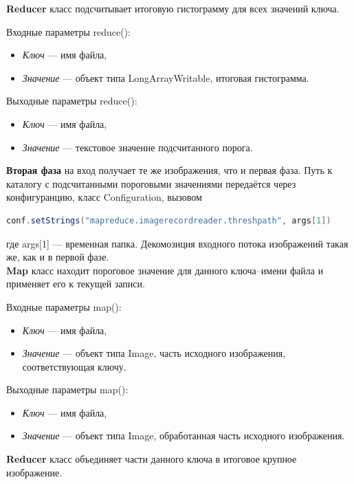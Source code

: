 \documentclass[12pt,a4paper]{extarticle} %
\begin{document}
    \noindent \textbf{Reducer} класс подсчитывает итоговую гистограмму для всех значений ключа. 

    \noindent Входные параметры reduce():
    \begin{itemize}
        \item[] \textit{Ключ} --- имя файла,
        \item[] \textit{Значение} --- объект типа LongArrayWritable, итоговая гистограмма.
    \end{itemize}

    \noindent Выходные параметры reduce():
    \begin{itemize}
        \item[] \textit{Ключ} --- имя файла,
        \item[] \textit{Значение} --- текстовое значение подсчитанного порога.
    \end{itemize}

 \textbf{Вторая фаза} на вход получает те же изображения, что и первая фаза. Путь к каталогу с подсчитанными пороговыми значениями передаётся через конфигуранцию, класс Configuration, вызовом
 \begin{lstlisting}[language=Java]
    conf.setStrings("mapreduce.imagerecordreader.threshpath", args[1]) 
\end{lstlisting}
где args[1] --- временная папка. Декомозиция входного потока изображений такая же, как и в первой фазе.\\[5pt]

    \noindent \textbf{Map} класс находит пороговое значение для данного ключа--имени файла и применяет его к текущей записи.

    \noindent Входные параметры map():
    \begin{itemize}
        \item[] \textit{Ключ} --- имя файла,
        \item[] \textit{Значение} --- объект типа Image, часть исходного изображения, соответствующая ключу.
    \end{itemize}

    \noindent Выходные параметры map():
    \begin{itemize}
        \item[] \textit{Ключ} --- имя файла,
        \item[] \textit{Значение} --- объект типа Image, обработанная часть исходного изображения.
    \end{itemize}

    \noindent \textbf{Reducer} класс объединяет части  данного ключа в итоговое крупное изображение. 
\end{document}

